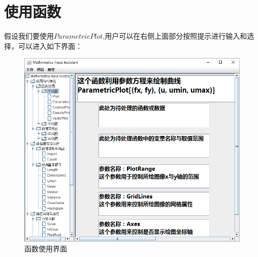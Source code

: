 \documentclass[hyperref, UTF8
,bookmarksnumbered=true, oneside]{ctexbook}
\begin{document}
	\section{使用函数}
		假设我们要使用$ParametricPlot$,用户可以在右侧上面部分按照提示进行输入和选择，可以进入如下界面：
		\begin{figure}[!h]
                	\centering
                	\includegraphics[width=5in]{5.png}
                	\caption{函数使用界面}    
                	\label{pic:MathObject}
            	\end{figure}
		
\end{document}
